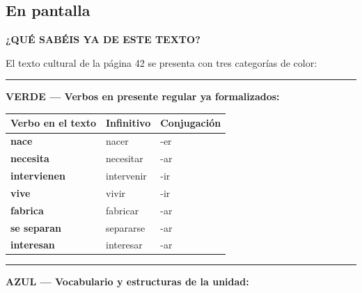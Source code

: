 \documentclass[a4paper,11pt]{article}
\begin{document}
\vspace{0.5cm}

\subsection*{En pantalla}

\begin{center}
{\Large\textbf{¿QUÉ SABÉIS YA DE ESTE TEXTO?}}
\end{center}

\vspace{0.3cm}

El texto cultural de la página 42 se presenta con tres categorías de color:

\vspace{0.3cm}

\noindent\textcolor{verde}{\rule{0.5cm}{0.5cm}}\hspace{0.3cm}\textbf{\textcolor{verde}{VERDE — Verbos en presente regular ya formalizados:}}

\vspace{0.2cm}

\begin{center}
\renewcommand{\arraystretch}{1.5}
\begin{tabular}{|>{\centering\arraybackslash}p{3.5cm}|>{\centering\arraybackslash}p{3.5cm}|>{\centering\arraybackslash}p{3.5cm}|}
\hline
\rowcolor{verde!10}
\textbf{Verbo en el texto} & \textbf{Infinitivo} & \textbf{Conjugación} \\
\hline
\textcolor{verde}{\textbf{nace}} & nacer & -er \\
\hline
\textcolor{verde}{\textbf{necesita}} & necesitar & -ar \\
\hline
\textcolor{verde}{\textbf{intervienen}} & intervenir & -ir \\
\hline
\textcolor{verde}{\textbf{vive}} & vivir & -ir \\
\hline
\textcolor{verde}{\textbf{fabrica}} & fabricar & -ar \\
\hline
\textcolor{verde}{\textbf{se separan}} & separarse & -ar \\
\hline
\textcolor{verde}{\textbf{interesan}} & interesar & -ar \\
\hline
\end{tabular}
\end{center}

\vspace{0.3cm}

\noindent\textcolor{azulg}{\rule{0.5cm}{0.5cm}}\hspace{0.3cm}\textbf{\textcolor{azulg}{AZUL — Vocabulario y estructuras de la unidad:}}
\end{document}
